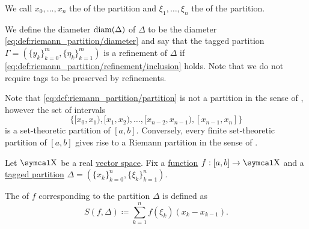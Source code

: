 \begin{definition}
\begin{DefEnum}
    We call \( x_0, \ldots, x_n \) the  of the partition and \( \xi_1, \ldots, \xi_n \) the  of the partition.

    We define the diameter \( \operatorname{diam}(\Delta) \) of \( \Delta \) to be the diameter \eqref{eq:def:riemann_partition/diameter} and say that the tagged partition \( \Gamma = ( \{ y_k \}_{k=0}^m, \{ \eta_k \}_{k=1}^m ) \) is a refinement of \( \Delta \) if \eqref{eq:def:riemann_partition/refinement/inclusion} holds. Note that we do not require tags to be preserved by refinements.
  \end{DefEnum}
\end{definition}

\begin{remark}\label{remark:set_and_riemann_partitions}
  Note that \eqref{eq:def:riemann_partition/partition} is not a partition in the sense of , however the set of intervals
  \begin{equation*}
    \Big\{ [x_0, x_1), [x_1, x_2), \ldots, [x_{n-2}, x_{n-1}), [x_{n-1}, x_n] \Big\}
  \end{equation*}
  is a set-theoretic partition of \( [a, b] \). Conversely, every finite set-theoretic partition of \( [a, b] \) gives rise to a Riemann partition in the sense of .
\end{remark}

\begin{definition}\label{def:riemann_sum}
  Let \( \CX \) be a real \hyperref[def:vector_space]{vector space}. Fix a \hyperref[def:function/single_valued]{function} \( f: [a, b] \to \CX \) and a \hyperref[def:riemann_partition/tagged]{tagged partition} \( \Delta = ( \{ x_k \}_{k=0}^n, \{ \xi_k \}_{k=1}^n ) \).

  The  of \( f \) corresponding to the partition \( \Delta \) is defined as
  \begin{equation*}
    S(f, \Delta) \coloneqq \sum_{k=1}^n f(\xi_k) (x_k - x_{k-1}).
  \end{equation*}
\end{definition}

